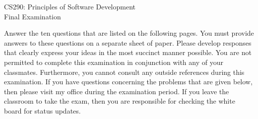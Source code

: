 \documentclass[12pt,epsf,psfig,graphics]{article}
\def\widow#1{\vskip #1\vbadness10000\penalty-200\vskip-#1}
\begin{document}
\def\widow#1{\vskip #1\vbadness10000\penalty-200\vskip-#1}

\begin{center}

CS290: Principles of Software Development \\
Final Examination \\

\end{center}

\noindent
Answer the ten questions that are listed on the following pages.  You
must provide answers to these questions on a separate sheet of paper.
Please develop responses that clearly express your ideas in the most
succinct manner possible.  You are not permitted to complete this
examination in conjunction with any of your classmates.  Furthermore,
you cannot consult any outside references during this examination.  If
you have questions concerning the problems that are given below, then
please visit my office during the examination period.  If you leave
the classroom to take the exam, then you are responsible for checking
the white board for status updates.

\end{document}
